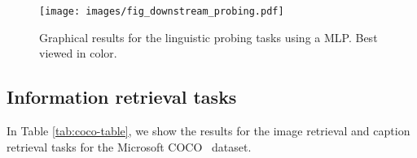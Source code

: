 \documentclass{article}
\begin{document}
\begin{figure}[!htb]
 \texttt{[image: images/fig\_downstream\_probing.pdf]}
\caption{Graphical results for the linguistic probing tasks using a MLP. Best viewed in color.}
\label{fig:downstream-probing-tasks}
\end{figure}

\subsection{Information retrieval tasks}
In Table \ref{tab:coco-table}, we show the results for the image retrieval and caption retrieval tasks for the Microsoft COCO~\cite{lin2014microsoft} dataset.


\begin{table}[!htb]
  \caption{Results for the image retrieval and caption retrieval tasks using the Microsoft COCO~\cite{lin2014microsoft} dataset and features extracted with a ResNet-101~\cite{he2016deep}. In this table we present Recall at 1 (R@1), Recall at 5 (R@5) and so on, as well as the median.}
  \label{tab:coco-table}
  \centering
\end{table}
\end{document}
